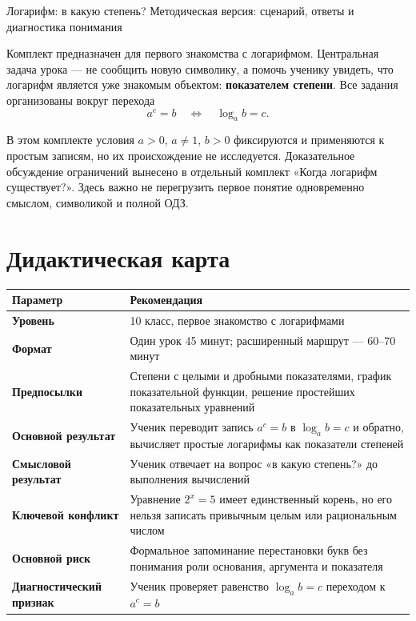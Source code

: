 
\worksheettitle
  {Логарифм: в какую степень?}
  {Методическая версия: сценарий, ответы и диагностика понимания}

\begin{teacherbox}
  Комплект предназначен для первого знакомства с логарифмом. Центральная
  задача урока --- не сообщить новую символику, а помочь ученику увидеть,
  что логарифм является уже знакомым объектом: \textbf{показателем степени}.
  Все задания организованы вокруг перехода
  \[
    a^c=b
    \quad\Longleftrightarrow\quad
    \log_a b=c.
  \]
\end{teacherbox}

\begin{teacherbox}
  В этом комплекте условия \(a>0\), \(a\ne1\), \(b>0\) фиксируются и
  применяются к простым записям, но их происхождение не исследуется.
  Доказательное обсуждение ограничений вынесено в отдельный комплект
  «Когда логарифм существует?». Здесь важно не перегрузить первое понятие
  одновременно смыслом, символикой и полной ОДЗ.
\end{teacherbox}

\section{Дидактическая карта}

\begin{center}
  \renewcommand{\arraystretch}{1.35}
  \begin{tabularx}{\textwidth}{@{}>{\bfseries\sffamily}p{}X@{}}
    \toprule
    \rowcolor{TableHeader}
    Параметр & Рекомендация \\
    \midrule
    Уровень & 10 класс, первое знакомство с логарифмами \\
    Формат & Один урок 45 минут; расширенный маршрут --- 60--70 минут \\
    Предпосылки & Степени с целыми и дробными показателями, график
      показательной функции, решение простейших показательных уравнений \\
    Основной результат & Ученик переводит запись \(a^c=b\) в
      \(\log_a b=c\) и обратно, вычисляет простые логарифмы как показатели
      степеней \\
    Смысловой результат & Ученик отвечает на вопрос «в какую степень?» до
      выполнения вычислений \\
    Ключевой конфликт & Уравнение \(2^x=5\) имеет единственный корень, но
      его нельзя записать привычным целым или рациональным числом \\
    Основной риск & Формальное запоминание перестановки букв без понимания
      роли основания, аргумента и показателя \\
    Диагностический признак & Ученик проверяет равенство
      \(\log_a b=c\) переходом к \(a^c=b\) \\
    \bottomrule
  \end{tabularx}
\end{center}

